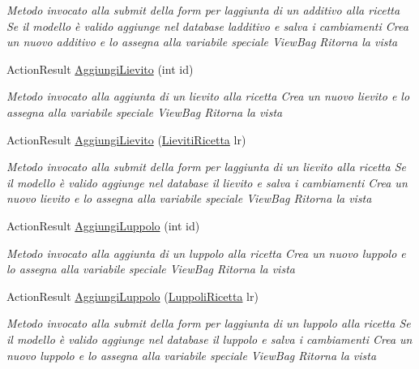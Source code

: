 \begin{DoxyCompactItemize}
\begin{DoxyCompactList}\small\item\em Metodo invocato alla submit della form per l\textquotesingle{}aggiunta di un additivo alla ricetta Se il modello è valido aggiunge nel database l\textquotesingle{}additivo e salva i cambiamenti Crea un nuovo additivo e lo assegna alla variabile speciale View\+Bag Ritorna la vista \end{DoxyCompactList}\item 
Action\+Result \mbox{\hyperlink{class_brew_day2_1_1_controllers_1_1_ricette_controller_a8fd1022084f01bd0f631a11238b813a1}{Aggiungi\+Lievito}} (int id)
\begin{DoxyCompactList}\small\item\em Metodo invocato alla aggiunta di un lievito alla ricetta Crea un nuovo lievito e lo assegna alla variabile speciale View\+Bag Ritorna la vista \end{DoxyCompactList}\item 
Action\+Result \mbox{\hyperlink{class_brew_day2_1_1_controllers_1_1_ricette_controller_a5473bc1c8fe4c43b01e7b68d3e0bca09}{Aggiungi\+Lievito}} (\mbox{\hyperlink{class_brew_day2_1_1_models_1_1_lieviti_ricetta}{Lieviti\+Ricetta}} lr)
\begin{DoxyCompactList}\small\item\em Metodo invocato alla submit della form per l\textquotesingle{}aggiunta di un lievito alla ricetta Se il modello è valido aggiunge nel database il lievito e salva i cambiamenti Crea un nuovo lievito e lo assegna alla variabile speciale View\+Bag Ritorna la vista \end{DoxyCompactList}\item 
Action\+Result \mbox{\hyperlink{class_brew_day2_1_1_controllers_1_1_ricette_controller_af7fb082a690b79fbc2f4d23ee9bcf279}{Aggiungi\+Luppolo}} (int id)
\begin{DoxyCompactList}\small\item\em Metodo invocato alla aggiunta di un luppolo alla ricetta Crea un nuovo luppolo e lo assegna alla variabile speciale View\+Bag Ritorna la vista \end{DoxyCompactList}\item 
Action\+Result \mbox{\hyperlink{class_brew_day2_1_1_controllers_1_1_ricette_controller_aaebe97b435fab3e99b45aff4a37aced8}{Aggiungi\+Luppolo}} (\mbox{\hyperlink{class_brew_day2_1_1_models_1_1_luppoli_ricetta}{Luppoli\+Ricetta}} lr)
\begin{DoxyCompactList}\small\item\em Metodo invocato alla submit della form per l\textquotesingle{}aggiunta di un luppolo alla ricetta Se il modello è valido aggiunge nel database il luppolo e salva i cambiamenti Crea un nuovo luppolo e lo assegna alla variabile speciale View\+Bag Ritorna la vista \end{DoxyCompactList}\item 

\end{DoxyCompactItemize}
